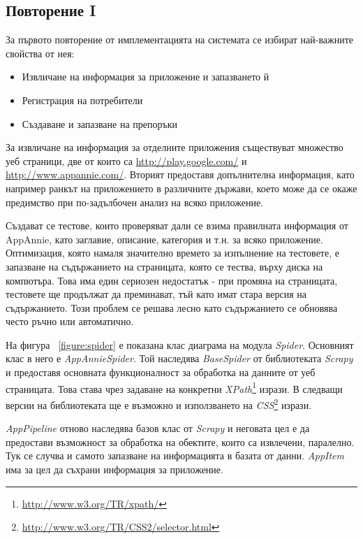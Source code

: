 	\subsection{Повторение I}
	
		За първото повторение от имплементацията на системата се избират най-важните свойства от нея:
		
		\begin{itemize}
			\item Извличане на информация за приложение и запазването й
			\item Регистрация на потребители
			\item Създаване и запазване на препоръки
		\end{itemize}
		
		За извличане на информация за отделните приложения съществуват множество уеб страници, две от които са \url{http://play.google.com/} и \url{http://www.appannie.com/}. Вторият предоставя допълнителна информация, като например ранкът на приложението в различните държави, което може да се окаже предимство при по-задълбочен анализ на всяко приложение.
		
		Създават се тестове, които проверяват дали се взима правилната информация от AppAnnie, като заглавие, описание, категория и т.н. за всяко приложение. Оптимизация, която намаля значително времето за изпълнение на тестовете, е запазване на съдържанието на страницата, която се тества, върху диска на компютъра. Това има един сериозен недостатък - при промяна на страницата, тестовете ще продължат да преминават, тъй като имат стара версия на съдържанието. Този проблем се решава лесно като съдържанието се обновява често ръчно или автоматично.
		
		На фигура ~\ref{figure:spider} е показана клас диаграма на модула \emph{Spider}. Основният клас в него е \emph{AppAnnieSpider}. Той наследява \emph{BaseSpider} от библиотеката \emph{Scrapy} и предоставя основната функционалност за обработка на данните от уеб страницата. Това става чрез задаване на конкретни \emph{XPath}\footnote{\url{http://www.w3.org/TR/xpath/}} изрази. В следващи версии на библиотеката ще е възможно и използването на \emph{CSS}\footnote{\url{http://www.w3.org/TR/CSS2/selector.html}} изрази.
		
		\emph{AppPipeline} отново наследява базов клас от \emph{Scrapy} и неговата цел е да предостави възможност за обработка на обектите, които са извлечени, паралелно. Тук се случва и самото запазване на информацията в базата от данни. \emph{AppItem} има за цел да съхрани информация за приложение.
		
